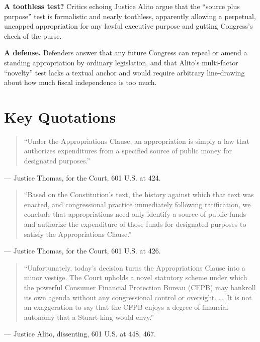 \documentclass[12pt]{article}
\begin{document}
\textbf{A toothless test?} Critics echoing Justice Alito argue that the ``source plus purpose'' test is formalistic and nearly toothless, apparently allowing a perpetual, uncapped appropriation for any lawful executive purpose and gutting Congress's check of the purse.

\textbf{A defense.} Defenders answer that any future Congress can repeal or amend a standing appropriation by ordinary legislation, and that Alito's multi-factor ``novelty'' test lacks a textual anchor and would require arbitrary line-drawing about how much fiscal independence is too much.

\section{Key Quotations}

\begin{quote}
``Under the Appropriations Clause, an appropriation is simply a law that authorizes expenditures from a specified source of public money for designated purposes.''
\end{quote}
\noindent --- Justice Thomas, for the Court, 601 U.S. at 424.

\begin{quote}
``Based on the Constitution's text, the history against which that text was enacted, and congressional practice immediately following ratification, we conclude that appropriations need only identify a source of public funds and authorize the expenditure of those funds for designated purposes to satisfy the Appropriations Clause.''
\end{quote}
\noindent --- Justice Thomas, for the Court, 601 U.S. at 426.

\begin{quote}
``Unfortunately, today's decision turns the Appropriations Clause into a minor vestige. The Court upholds a novel statutory scheme under which the powerful Consumer Financial Protection Bureau (CFPB) may bankroll its own agenda without any congressional control or oversight. \ldots\ It is not an exaggeration to say that the CFPB enjoys a degree of financial autonomy that a Stuart king would envy.''
\end{quote}
\noindent --- Justice Alito, dissenting, 601 U.S. at 448, 467.
\end{document}
